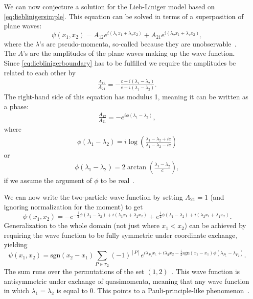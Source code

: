 \documentclass[11pt, a4paper]{report} %
\begin{document}
We can now conjecture a solution for the Lieb-Liniger model based on \cref{eq:lieblinigersimple}.
This equation can be solved in terms of a superposition of plane waves:
\begin{equation}
	\psi(x_1,x_2) = A_{12} e^{i(\lambda_1x_1 + \lambda_2 x_2)} + A_{21} e^{i(\lambda_2 x_1 + \lambda_1 x_2)},
\end{equation}
where the \(\lambda\)'s are pseudo-momenta, so-called because they are unobservable~\cite{Franchini2017}.
The \(A\)'s are the amplitudes of the plane waves making up the wave function.
Since \cref{eq:lieblinigerboundary} has to be fulfilled we require the amplitudes be related to each other by
\begin{align}
	\frac{A_{12}}{A_{21}} = -\frac{c-i(\lambda_1 - \lambda_2) }{c+i(\lambda_1 - \lambda_2)}.
\end{align}
The right-hand side of this equation has modulus 1, meaning it can be written as a phase:
\begin{align}
	\frac{A_{12}}{A_{21}} = -e^{i\phi(\lambda_1-\lambda_2)},
\end{align}
where~\cite{Korepin1993}
\begin{align}
  \phi(\lambda_1-\lambda_2) = i \log(\frac{\lambda_1-\lambda_2 + ic}{\lambda_1-\lambda_2-ic})
\end{align}
or
\begin{align}
	\phi(\lambda_1-\lambda_2) = 2\arctan\left(\frac{\lambda_1-\lambda_2}{c}\right),
\end{align}
if we assume the argument of \(\phi\) to be real~\cite{Panfil2014}.

We can now write the two-particle wave function by setting \(A_{21}=1\) (and ignoring normalization for the moment) to get
\begin{equation}
	\psi(x_1,x_2) = - e^{-\frac{i}{2}\phi(\lambda_1-\lambda_2)+i(\lambda_1x_1 + \lambda_2 x_2)} + e^{\frac{i}{2}\phi(\lambda_1-\lambda_2)+i(\lambda_2 x_1 + \lambda_1 x_2)}.
\end{equation}
Generalization to the whole domain (not just where \(x_1 < x_2\)) can be achieved by requiring the wave function to be fully symmetric under coordinate exchange,
yielding
\begin{equation}
  \psi(x_1,x_2) = \textrm{sgn}(x_2-x_1)\sum_{P\in\pi_2} (-1)^{[P]} e^{i\lambda_{P_1}x_1 + i \lambda_2 x_2- \frac{i}{2} \textrm{sgn}(x_2-x_1)\phi(\lambda_{P_1}-\lambda_{P_2})}.
\end{equation}
The sum runs over the permutations of the set \((1,2)\)~\cite{Caux2015}.
This wave function is antisymmetric under exchange of quasimomenta, meaning that any wave function in which \(\lambda_1=\lambda_2\) is equal to 0.
This points to a Pauli-principle-like phenomenon~\cite{Caux2009,Franchini2017}.
\end{document}
